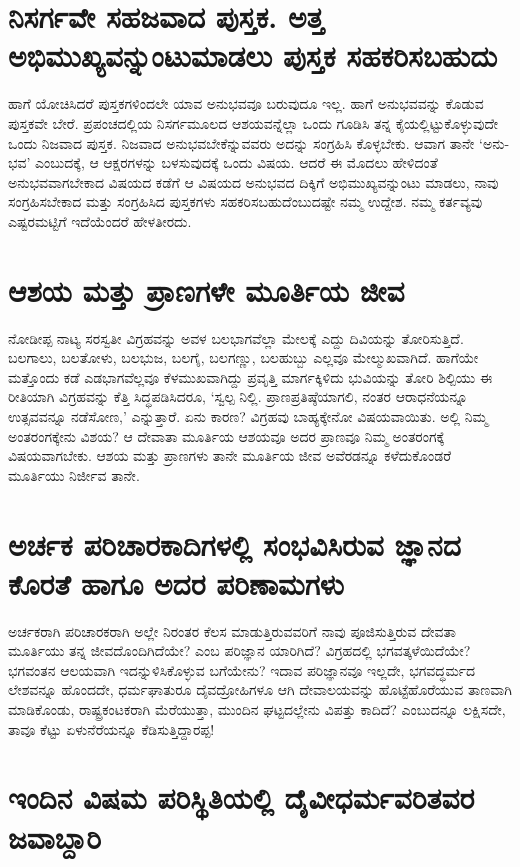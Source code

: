 \section*{ನಿಸರ್ಗವೇ ಸಹಜವಾದ ಪುಸ್ತಕ. ಅತ್ತ ಅಭಿಮುಖ್ಯವನ್ನುಂಟುಮಾಡಲು ಪುಸ್ತಕ ಸಹಕರಿಸಬಹುದು}

ಹಾಗೆ ಯೋಚಿಸಿದರೆ ಪುಸ್ತಕಗಳಿಂದಲೇ ಯಾವ ಅನುಭವವೂ ಬರುವುದೂ ಇಲ್ಲ. ಹಾಗೆ ಅನುಭವವನ್ನು ಕೊಡುವ ಪುಸ್ತಕವೇ ಬೇರೆ. ಪ್ರಪಂಚದಲ್ಲಿಯ ನಿಸರ್ಗಮೂಲದ ಆಶಯವನ್ನೆಲ್ಲಾ ಒಂದು ಗೂಡಿಸಿ ತನ್ನ ಕೈಯಲ್ಲಿಟ್ಟುಕೊಳ್ಳುವುದೇ  ಒಂದು ನಿಜವಾದ ಪುಸ್ತಕ. ನಿಜವಾದ ಅನುಭವಬೇಕೆನ್ನುವವರು ಅದನ್ನು ಸಂಗ್ರಹಿಸಿ ಕೊಳ್ಳಬೇಕು. ಆವಾಗ ತಾನೇ `ಅನು-ಭವ' ಎಂಬುದಕ್ಕೆ, ಆ ಆಕ್ಷರಗಳನ್ನು ಬಳಸುವುದಕ್ಕೆ ಒಂದು ವಿಷಯ. ಆದರೆ ಈ ಮೊದಲು ಹೇಳಿದಂತೆ ಅನುಭವವಾಗಬೇಕಾದ ವಿಷಯದ ಕಡೆಗೆ ಆ ವಿಷಯದ ಅನುಭವದ ದಿಕ್ಕಿಗೆ ಅಭಿಮುಖ್ಯವನ್ನುಂಟು ಮಾಡಲು, ನಾವು ಸಂಗ್ರಹಿಸಬೇಕಾದ ಮತ್ತು ಸಂಗ್ರಹಿಸಿದ ಪುಸ್ತಕಗಳು ಸಹಕರಿಸಬಹುದೆಂಬುದಷ್ಟೇ ನಮ್ಮ ಉದ್ದೇಶ. ನಮ್ಮ ಕರ್ತವ್ಯವು ಎಷ್ಟರಮಟ್ಟಿಗೆ ಇದೆಯೆಂದರೆ ಹೇಳತೀರದು.

\section*{ಆಶಯ ಮತ್ತು ಪ್ರಾಣಗಳೇ ಮೂರ್ತಿಯ ಜೀವ}

ನೋಡೀಪ್ಪ ನಾಟ್ಯ ಸರಸ್ವತೀ ವಿಗ್ರಹವನ್ನು ಅವಳ ಬಲಭಾಗವೆಲ್ಲಾ ಮೇಲಕ್ಕೆ ಎದ್ದು ದಿವಿಯನ್ನು ತೋರಿಸುತ್ತಿದೆ. ಬಲಗಾಲು, ಬಲತೋಳು, ಬಲಭುಜ, ಬಲಗೈ, ಬಲಗಣ್ಣು, ಬಲಹುಬ್ಬು ಎಲ್ಲವೂ ಮೇಲ್ಮುಖವಾಗಿದೆ. ಹಾಗೆಯೇ ಮತ್ತೊಂದು ಕಡೆ ಎಡಭಾಗವೆಲ್ಲವೂ ಕೆಳಮುಖವಾಗಿದ್ದು ಪ್ರವೃತ್ತಿ ಮಾರ್ಗಕ್ಕಿಳಿದು ಭುವಿಯನ್ನು ತೋರಿ ಶಿಲ್ಪಿಯು ಈ ರೀತಿಯಾಗಿ ವಿಗ್ರಹವನ್ನು ಕೆತ್ತಿ ಸಿದ್ಧಪಡಿಸಿದರೂ, `ಸ್ವಲ್ಪ ನಿಲ್ಲಿ. ಪ್ರಾಣಪ್ರತಿಷ್ಠೆಯಾಗಲಿ, ನಂತರ ಆರಾಧನೆಯನ್ನೂ ಉತ್ಸವವನ್ನೂ ನಡೆಸೋಣ,' ಎನ್ನುತ್ತಾರೆ. ಏನು ಕಾರಣ? ವಿಗ್ರಹವು ಬಾಹ್ಯಕ್ಕೇನೋ ವಿಷಯವಾಯಿತು. ಅಲ್ಲಿ ನಿಮ್ಮ ಅಂತರಂಗಕ್ಕೇನು ವಿಶಯ? ಆ ದೇವಾತಾ ಮೂರ್ತಿಯ ಆಶಯವೂ ಅದರ ಪ್ರಾಣವೂ ನಿಮ್ಮ ಅಂತರಂಗಕ್ಕೆ ವಿಷಯವಾಗಬೇಕು. ಆಶಯ ಮತ್ತು ಪ್ರಾಣಗಳು ತಾನೇ ಮೂರ್ತಿಯ ಜೀವ ಅವೆರಡನ್ನೂ ಕಳೆದುಕೊಂಡರೆ ಮೂರ್ತಿಯು ನಿರ್ಜೀವ ತಾನೇ.

\section*{ಅರ್ಚಕ ಪರಿಚಾರಕಾದಿಗಳಲ್ಲಿ ಸಂಭವಿಸಿರುವ ಜ್ಞಾನದ ಕೊರತೆ ಹಾಗೂ ಅದರ ಪರಿಣಾಮಗಳು}

ಅರ್ಚಕರಾಗಿ ಪರಿಚಾರಕರಾಗಿ ಅಲ್ಲೇ ನಿರಂತರ ಕೆಲಸ ಮಾಡುತ್ತಿರುವವರಿಗೆ ನಾವು ಪೂಜಿಸುತ್ತಿರುವ ದೇವತಾ ಮೂರ್ತಿಯು ತನ್ನ ಜೀವದೊಂದಿಗಿದೆಯೇ? ಎಂಬ ಪರಿಜ್ಞಾನ ಯಾರಿಗಿದೆ? ವಿಗ್ರಹದಲ್ಲಿ ಭಗವತ್ಕಳೆಯಿದೆಯೇ? ಭಗವಂತನ ಆಲಯವಾಗಿ ಇದನ್ನುಳಿಸಿಕೊಳ್ಳುವ ಬಗೆಯೇನು? ಇದಾವ ಪರಿಜ್ಞಾನವೂ ಇಲ್ಲದೇ, ಭಗವದ್ಧರ್ಮದ ಲೇಶವನ್ನೂ ಹೊಂದದೇ, ಧರ್ಮಘಾತುರೂ ದೈವದ್ರೋಹಿಗಳೂ ಆಗಿ ದೇವಾಲಯವನ್ನು ಹೊಟ್ಟೆಹೊರೆಯುವ ತಾಣವಾಗಿ ಮಾಡಿಕೊಂಡು, ರಾಷ್ಟ್ರಕಂಟಕರಾಗಿ ಮೆರೆಯುತ್ತಾ, ಮುಂದಿನ ಘಟ್ಟದಲ್ಲೇನು ವಿಪತ್ತು ಕಾದಿದೆ? ಎಂಬುದನ್ನೂ ಲಕ್ಷಿಸದೇ, ತಾವೂ ಕೆಟ್ಟು ಏಳುನೆರೆಯನ್ನೂ ಕೆಡಿಸುತ್ತಿದ್ದಾರಪ್ಪ!

\section*{ಇಂದಿನ ವಿಷಮ ಪರಿಸ್ಥಿತಿಯಲ್ಲಿ ದೈವೀಧರ್ಮವರಿತವರ ಜವಾಬ್ದಾರಿ}

